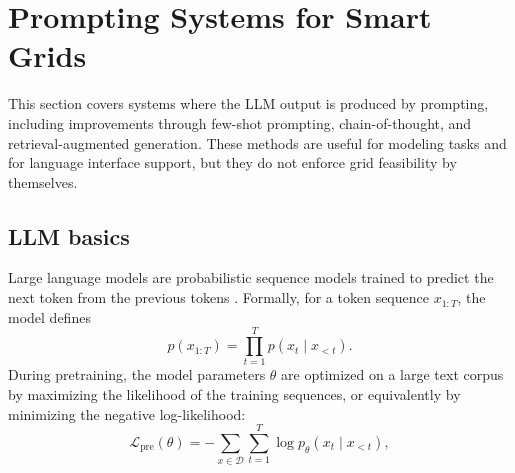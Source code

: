 \documentclass[journal,onecolumn]{IEEEtran} %
\begin{document}

\section{Prompting Systems for Smart Grids}
\label{sec:prompting}

This section covers systems where the LLM output is produced by prompting, including improvements through few-shot prompting, chain-of-thought, and retrieval-augmented generation. These methods are useful for modeling tasks and for language interface support, but they do not enforce grid feasibility by themselves.

\subsection{LLM basics}
Large language models are probabilistic sequence models trained to predict the next token from the previous tokens \cite{brown2020language,vaswani2017attention}. Formally, for a token sequence $x_{1:T}$, the model defines
\begin{equation}
p(x_{1:T}) = \prod_{t=1}^{T} p(x_t \mid x_{<t}).
\end{equation}
During pretraining, the model parameters $\theta$ are optimized on a large text corpus by maximizing the likelihood of the training sequences, or equivalently by minimizing the negative log-likelihood:
\begin{equation}
\label{loss_predict}
\mathcal{L}_{\text{pre}}(\theta)
= - \sum_{x \in \mathcal{D}} \sum_{t=1}^{T}
\log p_{\theta}(x_t \mid x_{<t}),
\end{equation}

\end{document}
